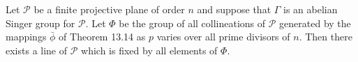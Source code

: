 Let $\mathcal{P}$ be a finite projective plane of order $n$ and suppose that $\Gamma$ is an abelian Singer group for $\mathcal{P}$. Let $\Phi$ be the group of all collineations of $\mathcal{P}$ generated by the mappings $\bar{\phi}$ of Theorem 13.14 as $p$ varies over all prime divisors of $n$. Then there exists a line of $\mathcal{P}$ which is fixed by all elements of $\Phi$.
